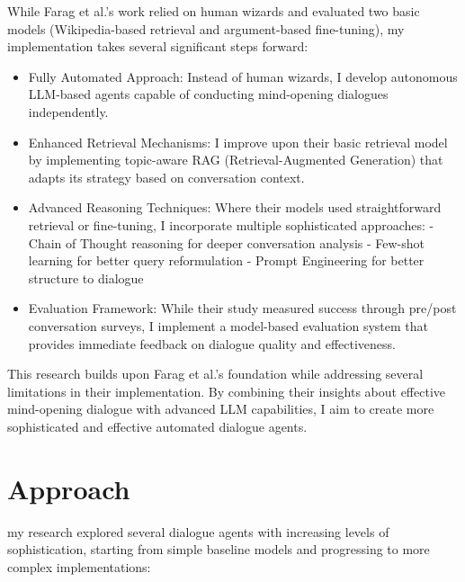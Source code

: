 \documentclass[11pt]{article}
\begin{document}
While Farag et al.'s work relied on human wizards and evaluated two basic models (Wikipedia-based retrieval and argument-based fine-tuning), my  implementation takes several significant steps forward:
\begin{itemize}

\item Fully Automated Approach: Instead of human wizards, I develop autonomous LLM-based agents capable of conducting mind-opening dialogues independently.

\item Enhanced Retrieval Mechanisms: I improve upon their basic retrieval model by implementing topic-aware RAG (Retrieval-Augmented Generation) that adapts its strategy based on conversation context.

\item Advanced Reasoning Techniques: Where their models used straightforward retrieval or fine-tuning, I incorporate multiple sophisticated approaches:
   - Chain of Thought reasoning for deeper conversation analysis
   - Few-shot learning for better query reformulation
   - Prompt Engineering for better structure to dialogue

\item Evaluation Framework: While their study measured success through pre/post conversation surveys, I implement a model-based evaluation system that provides immediate feedback on dialogue quality and effectiveness.
\end{itemize}
This research builds upon Farag et al.'s foundation while addressing several limitations in their implementation. By combining their insights about effective mind-opening dialogue with advanced LLM capabilities, I aim to create more sophisticated and effective automated dialogue agents.

\section{Approach}
my research explored several dialogue agents with increasing levels of sophistication, starting from simple baseline models and progressing to more complex implementations:
\end{document}
